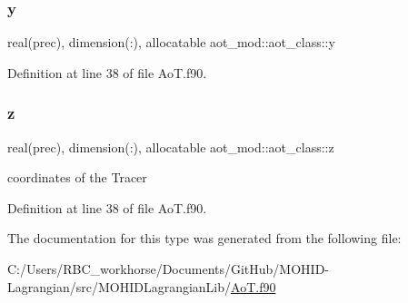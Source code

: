 \subsubsection{\texorpdfstring{y}{y}}
{\footnotesize\ttfamily real(prec), dimension(\+:), allocatable aot\+\_\+mod\+::aot\+\_\+class\+::y\hspace{0.3cm}{\ttfamily [private]}}



Definition at line 38 of file Ao\+T.\+f90.

\mbox{\label{structaot__mod_1_1aot__class_a93f7b7406cbec91c69fdac5bc3505522}} 
\subsubsection{\texorpdfstring{z}{z}}
{\footnotesize\ttfamily real(prec), dimension(\+:), allocatable aot\+\_\+mod\+::aot\+\_\+class\+::z\hspace{0.3cm}{\ttfamily [private]}}



coordinates of the Tracer 



Definition at line 38 of file Ao\+T.\+f90.



The documentation for this type was generated from the following file\+:\begin{DoxyCompactItemize}
\item 
C\+:/\+Users/\+R\+B\+C\+\_\+workhorse/\+Documents/\+Git\+Hub/\+M\+O\+H\+I\+D-\/\+Lagrangian/src/\+M\+O\+H\+I\+D\+Lagrangian\+Lib/\mbox{\hyperlink{_ao_t_8f90}{Ao\+T.\+f90}}\end{DoxyCompactItemize}
